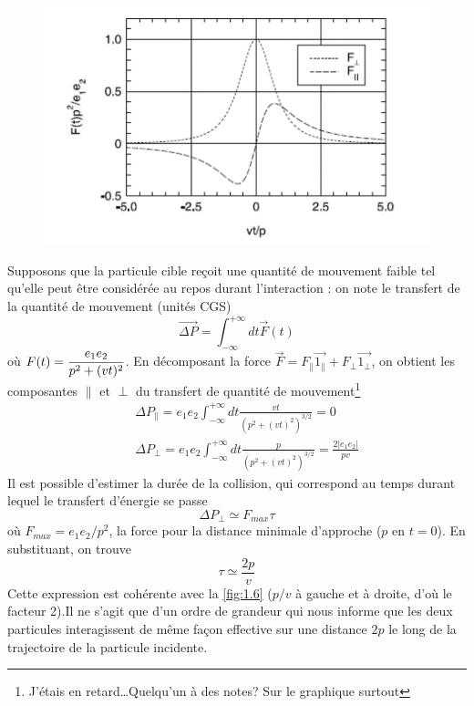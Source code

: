 	\begin{figure}
	\vspace{-8mm}
	\includegraphics[scale=0.55]{ch1/image7.png}
	\end{figure}
Supposons que la particule cible reçoit une quantité de mouvement faible tel qu'elle peut 
être considérée au repos durant l'interaction : on note le transfert de la quantité de
mouvement (unités CGS)
\begin{equation}
\overrightarrow{\Delta P}=\int_{-\infty}^{+\infty} dt \overrightarrow{F}(t)
\end{equation}
où $\displaystyle F(t)=\frac{e_1e_2}{p^2+(vt)^2}$. En décomposant la force $\overrightarrow{F}=
F_{\parallel}\overrightarrow{1_{\parallel}}+F_{\perp}\overrightarrow{1_{\perp}}$, on 
obtient les composantes $\parallel$ et $\perp$ du transfert de quantité de mouvement\footnote{J'étais en retard\dots Quelqu'un à des notes? Sur le graphique surtout}
\begin{eqnarray}
&&\Delta P_\parallel=e_1e_2\int_{-\infty}^{+\infty}dt\frac{vt}{(p^2+(vt)^2)^{3/2}}=0\\
&&\Delta P_\perp=e_1e_2\int_{-\infty}^{+\infty}dt\frac{p}{(p^2+(vt)^2)^{3/2}}=\frac{2|e_1e_2|}{pv}
\end{eqnarray}
Il est possible d'estimer la durée de la collision, qui correspond au temps durant lequel 
le transfert d'énergie se passe
\begin{equation}
\Delta P_{\perp}\simeq F_{max}\tau
\end{equation}
où $F_{max} = e_1e_2/p^2$, la force pour la distance minimale d'approche ($p$ en $t=0$). En 
substituant, on trouve
\begin{equation}
\tau\simeq\frac{2p}{v} 
\end{equation}
Cette expression est cohérente avec la \autoref{fig:1.6} ($p/v$ à gauche et à droite, d'où le facteur 2).Il ne s'agit que d'un ordre de grandeur qui nous informe que les deux particules interagissent
de même façon effective sur une distance $2p$ le long de la trajectoire de la particule incidente.\\

